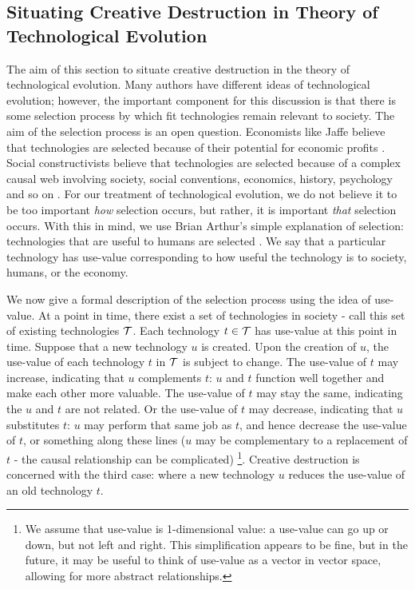 \documentclass[11pt]{article}
\begin{document}
\subsection{Situating Creative Destruction in Theory of Technological Evolution}
The aim of this section to situate creative destruction in the theory of technological evolution.
Many authors have different ideas of technological evolution; however, the important component for this discussion is that there is some selection process by which fit technologies remain relevant to society.
The aim of the selection process is an open question.
Economists like Jaffe believe that technologies are selected because of their potential for economic profits \cite{jaffe}.
Social constructivists believe that technologies are selected because of a complex causal web involving society, social conventions, economics, history, psychology and so on \cite{scot}.
For our treatment of technological evolution, we do not believe it to be too important \textit{how} selection occurs, but rather, it is important \textit{that} selection occurs. 
With this in mind, we use Brian Arthur's simple explanation of selection: technologies that are useful to humans are selected \cite{arthur}.
We say that a particular technology has use-value corresponding to how useful the technology is to society, humans, or the economy. 

We now give a formal description of the selection process using the idea of use-value. 
At a point in time, there exist a set of technologies in society - call this set of existing technologies $\mathcal{T}$. 
Each technology $t \in \mathcal{T}$ has use-value at this point in time. 
Suppose that a new technology $u$ is created.
Upon the creation of $u$, the use-value of each technology $t$ in $\mathcal{T}$ is subject to change.
The use-value of $t$ may increase, indicating that $u$ complements $t$: $u$ and $t$ function well together and make each other more valuable.
The use-value of $t$ may stay the same, indicating the $u$ and $t$ are not related.
Or the use-value of $t$ may decrease, indicating that $u$ substitutes $t$: $u$ may perform that same job as $t$, and hence decrease the use-value of $t$, or something along these lines ($u$ may be complementary to a replacement of $t$ - the causal relationship can be complicated)
\footnote{We assume that use-value is 1-dimensional value: a use-value can go up or down, but not left and right. 
This simplification appears to be fine, but in the future, it may be useful to think of use-value as a vector in vector space, allowing for more abstract relationships.}.
Creative destruction is concerned with the third case: where a new technology $u$ reduces the use-value of an old technology $t$. 
\end{document}
